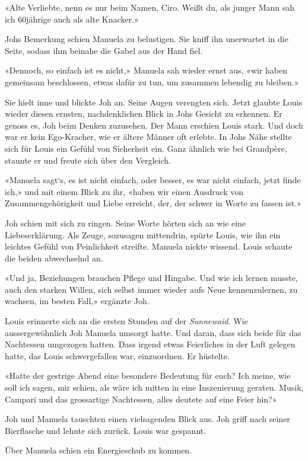 «Alte Verliebte, nenn es nur beim Namen, Ciro. Weißt du, als junger Mann
sah ich 60jährige auch als alte Knacker.»

Johs Bemerkung schien Manuela zu belustigen. Sie kniff ihn unerwartet in
die Seite, sodass ihm beinahe die Gabel aus der Hand fiel.

«Dennoch, so einfach ist es nicht,» Manuela sah wieder ernst aus, «wir
haben gemeinsam beschlossen, etwas dafür zu tun, um zusammen lebendig zu
bleiben.»

Sie hielt inne und blickte Joh an. Seine Augen verengten sich. Jetzt
glaubte Louis wieder diesen ernsten, nachdenklichen Blick in Johs
Gesicht zu erkennen. Er genoss es, Joh beim Denken zuzusehen. Der Mann
erschien Louis stark. Und doch war er kein Ego-Kracher, wie er ältere
Männer oft erlebte. In Johs Nähe stellte sich für Louis ein Gefühl von
Sicherheit ein. Ganz ähnlich wie bei Grandpère, staunte er und freute
sich über den Vergleich.

«Manuela sagt`s, es ist nicht einfach, oder besser, es war nicht
einfach, jetzt finde ich,» und mit einem Blick zu ihr, «haben wir einen
Ausdruck von Zusammengehörigkeit und Liebe erreicht, der, der schwer in
Worte zu fassen ist.»

Joh schien mit sich zu ringen. Seine Worte hörten sich an wie eine
Liebeserklärung. Als Zeuge, sozusagen mittendrin, spürte Louis, wie ihn
ein leichtes Gefühl von Peinlichkeit streifte. Manuela nickte wissend.
Louis schaute die beiden abwechselnd an.

«Und ja, Beziehungen brauchen Pflege und Hingabe. Und wie ich lernen
musste, auch den starken Willen, sich selbst immer wieder aufs Neue
kennenzulernen, zu wachsen, im besten Fall,» ergänzte Joh.

Louis erinnerte sich an die ersten Stunden auf der \emph{Sunnewaid.} Wie
aussergewöhnlich Joh Manuela umsorgt hatte. Und daran, dass sich beide
für das Nachtessen umgezogen hatten. Dass irgend etwas Feierliches in
der Luft gelegen hatte, das Louis schwergefallen war, einzuordnen. Er
hüstelte.

«Hatte der gestrige Abend eine besondere Bedeutung für euch? Ich meine,
wie soll ich sagen, mir schien, als wäre ich mitten in eine Inszenierung
geraten. Musik, Campari und das grossartige Nachtessen, alles deutete
auf eine Feier hin?»

Joh und Manuela tauschten einen vielsagenden Blick aus. Joh griff nach
seiner Bierflasche und lehnte sich zurück. Louis war gespannt.

Über Manuela schien ein Energieschub zu kommen.

